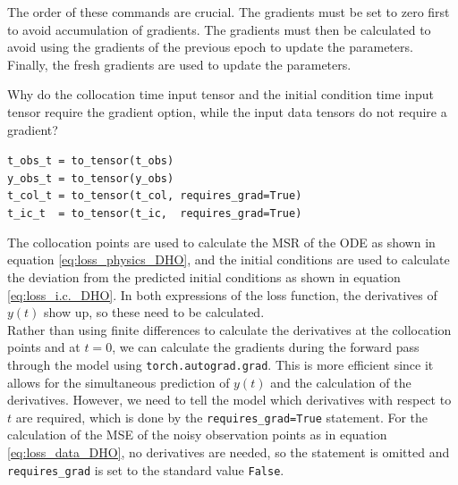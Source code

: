 \documentclass[we,twoside,openright,a4paper,11pt]{uantwerpenbamathesis}
\begin{document}
The order of these commands are crucial. The gradients must be set to zero first to avoid accumulation of gradients. The gradients must then be calculated to avoid using the gradients of the previous epoch to update the parameters. Finally, the fresh gradients are used to update the parameters. \cite{pytorch2025}

\begin{tcolorbox}[title=Question 7, colback=blue!10!white, colframe=blue!40!white, sharp corners]
    Why do the collocation time input tensor and the initial condition time input tensor require the gradient option, while the input data tensors do not require a gradient?
    \begin{tcolorbox}[colback=gray!10!white, colframe=gray!40!white]
        \verb|t_obs_t = to_tensor(t_obs)|\\
        \verb|y_obs_t = to_tensor(y_obs)|\\
        \verb|t_col_t = to_tensor(t_col, requires_grad=True)|\\
        \verb|t_ic_t  = to_tensor(t_ic,  requires_grad=True)|
    \end{tcolorbox}
\end{tcolorbox}
The collocation points are used to calculate the MSR of the ODE as shown in equation \ref{eq:loss_physics_DHO}, and the initial conditions are used to calculate the deviation from the predicted initial conditions as shown in equation \ref{eq:loss_i.c._DHO}. In both expressions of the loss function, the derivatives of $y(t)$ show up, so these need to be calculated.\\

Rather than using finite differences to calculate the derivatives at the collocation points and at $t=0$, we can calculate the gradients during the forward pass through the model using \verb|torch.autograd.grad|. This is more efficient since it allows for the simultaneous prediction of $y(t)$ and the calculation of the derivatives. However, we need to tell the model which derivatives with respect to $t$ are required, which is done by the \verb|requires_grad=True| statement. For the calculation of the MSE of the noisy observation points as in equation \ref{eq:loss_data_DHO}, no derivatives are needed, so the statement is omitted and \verb|requires_grad| is set to the standard value \verb|False|. \cite{pytorch2025}
\end{document}
